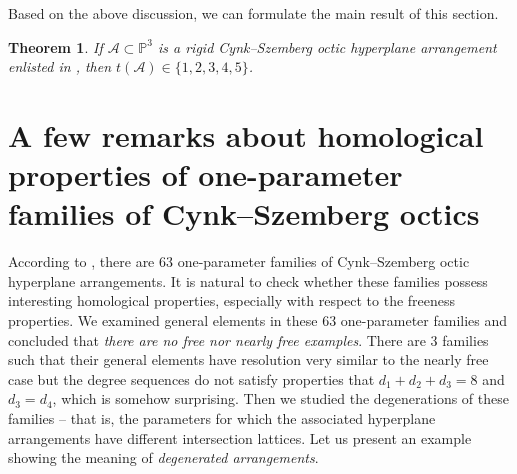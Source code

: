 \documentclass[11pt]{article}
\theoremstyle{plain}
\newtheorem{theorem}[thm]{Theorem}
\theoremstyle{definition}
\begin{document}
Based on the above discussion, we can formulate the main result of this section.
\begin{theorem}
\label{rigOC}
If $\mathcal{A} \subset \mathbb{P}^{3}$ is a rigid Cynk--Szemberg octic hyperplane arrangement enlisted in \cite{Cynks}, then $t(\mathcal{A}) \in \{1,2,3,4,5\}$.
\end{theorem}
\section{A few remarks about homological properties of one-parameter families of Cynk--Szemberg octics}
According to \cite[Section 4.2.5]{Meyer}, there are $63$ one-parameter families of Cynk--Szemberg octic hyperplane arrangements. It is natural to check whether these families possess interesting homological properties, especially with respect to the freeness properties. We examined general elements in these $63$ one-parameter families and concluded that \textit{there are no free nor nearly free examples}. There are $3$ families such that their general elements have resolution very similar to the nearly free case but the degree sequences do not satisfy properties that $d_{1}+d_{2}+d_{3}=8$ and $d_{3}=d_{4}$, which is somehow surprising.
Then we studied the degenerations of these families -- that is, the parameters for which the associated hyperplane arrangements have different intersection lattices. Let us present an example showing the meaning of \textit{degenerated arrangements}.
\end{document}
